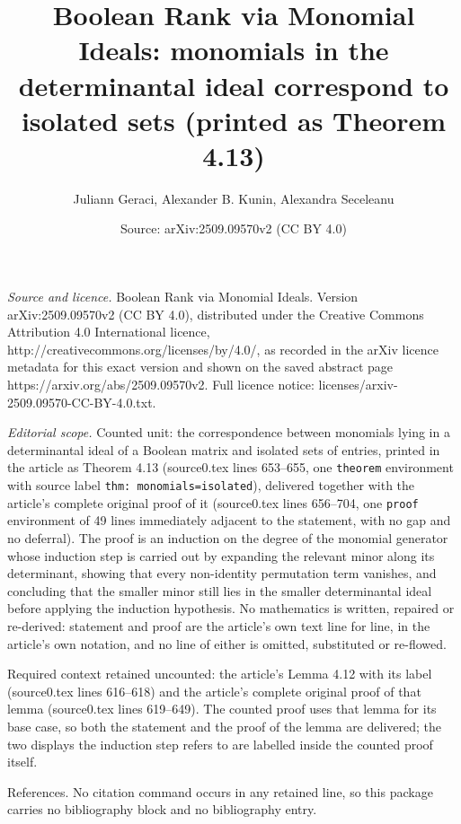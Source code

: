 \documentclass[10pt,a4paper]{amsart}
\title[Boolean Rank via Monomial Ideals]{Boolean Rank via Monomial Ideals: monomials in the determinantal ideal correspond to isolated sets (printed as Theorem 4.13)}
\author{Juliann Geraci, Alexander B. Kunin, Alexandra Seceleanu}
\date{Source: arXiv:2509.09570v2 (CC BY 4.0)}
\theoremstyle{plain}
\theoremstyle{definition}
\begin{document}
\maketitle

\noindent\emph{Source and licence.} Boolean Rank via Monomial Ideals. Version arXiv:2509.09570v2 (CC BY 4.0), distributed under the Creative Commons Attribution 4.0 International licence, http://creativecommons.org/licenses/by/4.0/, as recorded in the arXiv licence metadata for this exact version and shown on the saved abstract page https://arxiv.org/abs/2509.09570v2. Full licence notice: licenses/arxiv-2509.09570-CC-BY-4.0.txt.\par\smallskip

\noindent\textit{Editorial scope.} Counted unit: the correspondence between monomials lying in a determinantal ideal of a Boolean matrix and isolated sets of entries, printed in the article as Theorem 4.13 (source0.tex lines 653--655, one \texttt{theorem} environment with source label \texttt{thm: monomials=isolated}), delivered together with the article's complete original proof of it (source0.tex lines 656--704, one \texttt{proof} environment of 49 lines immediately adjacent to the statement, with no gap and no deferral). The proof is an induction on the degree of the monomial generator whose induction step is carried out by expanding the relevant minor along its determinant, showing that every non-identity permutation term vanishes, and concluding that the smaller minor still lies in the smaller determinantal ideal before applying the induction hypothesis. No mathematics is written, repaired or re-derived: statement and proof are the article's own text line for line, in the article's own notation, and no line of either is omitted, substituted or re-flowed.

Required context retained uncounted: the article's Lemma 4.12 with its label (source0.tex lines 616--618) and the article's complete original proof of that lemma (source0.tex lines 619--649). The counted proof uses that lemma for its base case, so both the statement and the proof of the lemma are delivered; the two displays the induction step refers to are labelled inside the counted proof itself.

References. No citation command occurs in any retained line, so this package carries no bibliography block and no bibliography entry.
\end{document}
